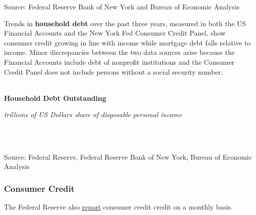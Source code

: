 \documentclass{report}
\begin{document}
{{{\begin{minipage}{0.76\textwidth}


\vspace{1mm}

\footnotesize{Source: Federal Reserve Bank of New York and Bureau of Economic Analysis}


\end{minipage}

\newpage


\begin{minipage}{0.76\textwidth}

\small Trends in \textbf{household debt} over the past three years, measured in both the US Financial Accounts and the New York Fed Consumer Credit Panel, show consumer credit growing in line with income while mortgage debt falls relative to income. Minor discrepancies between the two data sources arise because the Financial Accounts include debt of nonprofit institutions and the Consumer Credit Panel does not include persons without a social security number.\\

 \\

 

\vspace{3mm}

\normalsize \textbf{Household Debt Outstanding}

\footnotesize{\textit{trillions of US Dollars \hspace{46mm} share of disposable personal income}

 \setlength{\tabcolsep}{3.1pt} \color{black!90}
		{\renewcommand{\arraystretch}{1.54}
		 \begin{tabular}{p{36mm} R{11.8mm} R{11.8mm}  R{8.0mm} R{7.4mm} R{7.4mm} 
		   R{7.4mm} R{7.4mm}}
			 
			 \hline
		\end{tabular}
		}	\\}
		
\footnotesize{Source: Federal Reserve, Federal Reserve Bank of New York, Bureau of Economic Analysis}
\end{minipage}
\newpage
\begin{minipage}{0.76\textwidth}
\subsubsection*{\color{black!70} \seriffont Consumer Credit}

\small The Federal Reserve also \href{https://www.federalreserve.gov/releases/g19/current/default.htm}{report} consumer credit credit on a monthly basis. \\


\end{minipage}}}}
\end{document}
